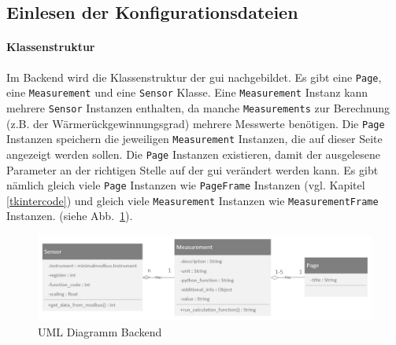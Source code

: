 \subsection{Einlesen der Konfigurationsdateien} \label{einlesen_konfigurationsdateien}
\paragraph{Klassenstruktur}
Im Backend wird die Klassenstruktur der \ac{gui} nachgebildet. Es gibt eine \lstinline{Page}, eine \lstinline{Measurement} und eine \lstinline{Sensor} Klasse. Eine \lstinline{Measurement} Instanz kann mehrere \lstinline{Sensor} Instanzen enthalten, da manche \lstinline{Measurements} zur Berechnung (z.B. der Wärmerückgewinnungsgrad) mehrere Messwerte benötigen. Die \lstinline{Page} Instanzen speichern die jeweiligen \lstinline{Measurement} Instanzen, die auf dieser Seite angezeigt werden sollen. Die \lstinline{Page} Instanzen existieren, damit der ausgelesene Parameter an der richtigen Stelle auf der \acs{gui} verändert werden kann. Es gibt nämlich gleich viele \lstinline{Page} Instanzen wie \lstinline{PageFrame} Instanzen (vgl. Kapitel \ref{tkintercode}) und gleich viele \lstinline{Measurement} Instanzen wie \lstinline{MeasurementFrame} Instanzen. (siehe Abb.~\ref{fig:uml_backend}).
\begin{figure}[ht]
	\centering
	\includegraphics[width=1.0\linewidth]{Bilder/UML_Backend}
	\caption{UML Diagramm Backend}
	\label{fig:uml_backend}
\end{figure}

